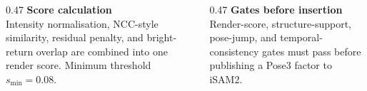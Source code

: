 \documentclass[
	aspectratio=169,
	t,
	onlytextwidth,
	10pt,
]{beamer}
\begin{document}
\begin{frame}
	\vspace{1mm}
	\begin{columns}[T]
		\begin{column}{0.47\textwidth}
			{\scriptsize\textbf{Score calculation}}\\[-0.5mm]
			{\tiny Intensity normalisation, NCC-style similarity, residual penalty, and bright-return overlap are combined into one render score. Minimum threshold \(s_{\min}=0.08\).}
		\end{column}
		\begin{column}{0.47\textwidth}
			{\scriptsize\textbf{Gates before insertion}}\\[-0.5mm]
			{\tiny Render-score, structure-support, pose-jump, and temporal-consistency gates must pass before publishing a Pose3 factor to iSAM2.}
		\end{column}
	\end{columns}
\end{frame}

\end{document}
